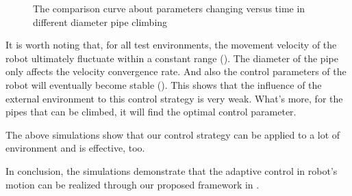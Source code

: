 \begin{figure}[!t]
	\caption{The comparison curve about parameters changing versus time in different diameter pipe climbing}
\end{figure}

It is worth noting that, for all test environments, the movement velocity of the robot  ultimately fluctuate within a constant range  (). The diameter of the pipe only affects the velocity convergence rate. And also the control parameters of the robot will eventually become stable (). This shows that the influence of the external environment to this control strategy is very weak. What's more, for the pipes that can be climbed, it will find the optimal control parameter.

The above simulations show that our control strategy can be applied to a lot of environment and is effective, too.

In conclusion, the simulations demonstrate that the adaptive control in robot's motion can be realized through our proposed framework in .
